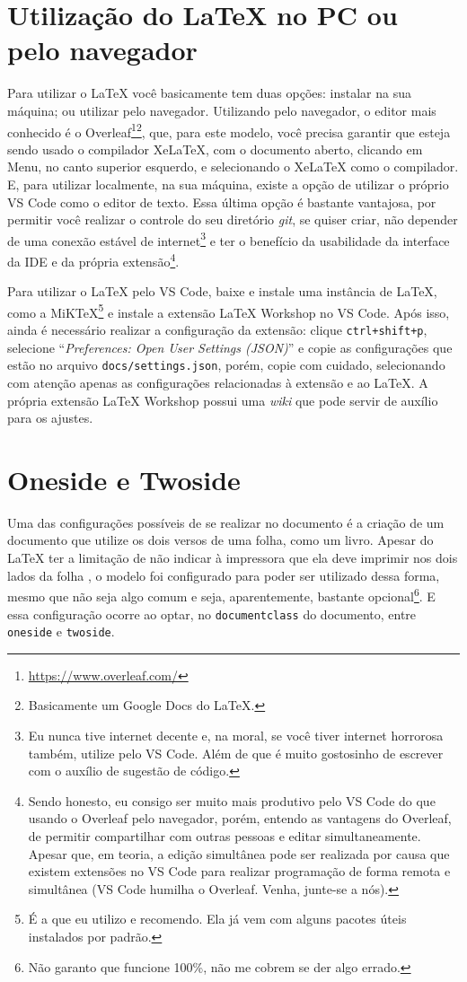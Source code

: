 \section{Utilização do \LaTeX{} no PC ou pelo navegador}
Para utilizar o \LaTeX{} você basicamente tem duas opções: instalar na sua máquina; ou utilizar pelo navegador. Utilizando pelo navegador, o editor mais conhecido é o Overleaf\footnote{\url{https://www.overleaf.com/}}\footnote{Basicamente um Google Docs do \LaTeX{}.}, que, para este modelo, você precisa garantir que esteja sendo usado o compilador XeLaTeX, com o documento aberto, clicando em Menu, no canto superior esquerdo, e selecionando o XeLaTeX como o compilador. E, para utilizar localmente, na sua máquina, existe a opção de utilizar o próprio VS Code como o editor de texto. Essa última opção é bastante vantajosa, por permitir você realizar o controle do seu diretório \textit{git}, se quiser criar, não depender de uma conexão estável de internet\footnote{Eu nunca tive internet decente e, na moral, se você tiver internet horrorosa também, utilize pelo VS Code. Além de que é muito gostosinho de escrever com o auxílio de sugestão de código.} e ter o benefício da usabilidade da interface da IDE e da própria extensão\footnote{Sendo honesto, eu consigo ser muito mais produtivo pelo VS Code do que usando o Overleaf pelo navegador, porém, entendo as vantagens do Overleaf, de permitir compartilhar com outras pessoas e editar simultaneamente. Apesar que, em teoria, a edição simultânea pode ser realizada por causa que existem extensões no VS Code para realizar programação de forma remota e simultânea (VS Code humilha o Overleaf. Venha, junte-se a nós).}.

Para utilizar o \LaTeX{} pelo VS Code, baixe e instale uma instância de \LaTeX{}, como a MiKTeX\footnote{É a que eu utilizo e recomendo. Ela já vem com alguns pacotes úteis instalados por padrão.} e instale a extensão LaTeX Workshop no VS Code. Após isso, ainda é necessário realizar a configuração da extensão: clique \texttt{ctrl+shift+p}, selecione ``\textit{Preferences: Open User Settings (JSON)}'' e copie as configurações que estão no arquivo \texttt{docs/settings.json}, porém, copie com cuidado, selecionando com atenção apenas as configurações relacionadas à extensão e ao \LaTeX{}. A própria extensão LaTeX Workshop possui uma \textit{wiki} que pode servir de auxílio para os ajustes.

\section{Oneside e Twoside}
Uma das configurações possíveis de se realizar no documento é a criação de um documento que utilize os dois versos de uma folha, como um livro. Apesar do \LaTeX{} ter a limitação de não indicar à impressora que ela deve imprimir nos dois lados da folha \cite{site:latex-impressora}, o modelo foi configurado para poder ser utilizado dessa forma, mesmo que não seja algo comum e seja, aparentemente, bastante opcional\footnote{Não garanto que funcione 100\%, não me cobrem se der algo errado.}. E essa configuração ocorre ao optar, no \texttt{documentclass} do documento, entre \texttt{oneside} e \texttt{twoside}.

